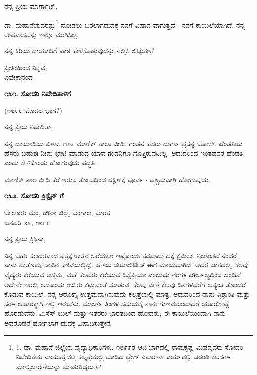 ನನ್ನ ಪ್ರಿಯ ಮಾರ್ಗಾಟ್,

ಡಾ. ಮಹಾನೆಯವರನ್ನು\footnote{1. ಡಾ. ಮಹಾನೆ ಜಿಲ್ಲೆಯ ವೈದ್ಯಾಧಿಕಾರಿಗಳು. ೧೮೯೯ರ ಆದಿ ಭಾಗದಲ್ಲಿ ರಾಮಕೃಷ್ಣ ಮಿಷನ್ನವರು ಸೋದರಿ ನಿವೇದಿತೆಯ ನಾಯಕತ್ವದಲ್ಲಿ ಕಲ್ಕತ್ತೆಯಲ್ಲಿ ಮಾಡಿದ ಪ್ಲೇಗ್ ನಿವಾರಣಾ ಕಾರ್ಯದಲ್ಲಿ ಚರಂಡಿ ಕೆಲಸಗಳ ಮೇಲ್ವಿಚಾರಣೆಯನ್ನು ಮಾಡುತ್ತಿದ್ದರು.} ನೋಡಲು ಬರಲಾಗದುದಕ್ಕೆ ನನಗೆ ವಿಷಾದ ವಾಗುತ್ತದೆ - ನನಗೆ ಕಾಯಿಲೆಯಾಗಿದೆ. ನನ್ನ ಉಪವಾಸವನ್ನು ಇನ್ನೂ ಮುಗಿಸಿಲ್ಲ.

ನನ್ನ ಕಿರಿಯ ದಾಯಾದಿಗೆ ಪಾಠ ಹೇಳಿಕೊಡುವುದನ್ನು ನಿಲ್ಲಿಸಿ ಬಿಟ್ಟೆಯಾ?

\begin{flushright}
ಪ್ರೀತಿಯಿಂದ ನಿನ್ನವ,\\ವಿವೇಕಾನಂದ
\end{flushright}

\begin{center}
\textbf{೧೩೧. ಸೋದರಿ ನಿವೇದಿತಾಳಿಗೆ}
\end{center}

\begin{flushright}
(೧೮೯೯ ಮೊದಲ ಭಾಗ?)
\end{flushright}

ನನ್ನ ಪ್ರಿಯ ನಿವೇದಿತಾ,

ನನ್ನ ದಾಯಾದಿಯ ವಿಳಾಸ ೧೨೭ ಮಾಣಿಕ್ ತಾಲಾ ಬೀದಿ. ಗಂಡನ ಹೆಸರು ದುರ್ಗಾ ಪ್ರಸನ್ನ ಬೋಸ್. ಹೆಂಡತಿಯ ಹೆಸರು ಬಹುಶಃ ನೀನು ಭೇಟಿ ಮಾಡುವ ಯಾವ ಗಂಡನಿಗೂ ಗೊತ್ತಿರುವುದಿಲ್ಲ. ಆದುದರಿಂದ ಇಂತಹವರ ಹೆಂಡತಿ ಎಂದು ಕೇಳಿಕೊಂಡು ಹೋಗುವುದು ಪದ್ಧತಿ.

ಮಾಣಿಕ್ ತಾಲ ಬೀದಿ ಕೆರೆ ಇರುವ ತೋಟದಿಂದ ದಕ್ಷಿಣಕ್ಕೆ ಪೂರ್ವ - ಪಶ್ಚಿಮವಾಗಿ ಹೋಗುವುದು.

\begin{center}
\textbf{೧೩೨. ಸೋದರಿ ಕ್ರಿಸ್ಟೈನ್ ಗೆ}
\end{center}

\begin{flushright}
ಬೇಲೂರು ಮಠ, ಹೌರಾ ಜಿಲ್ಲೆ, ಬಂಗಾಲ, ಭಾರತ\\ಜನವರಿ ೨೬, ೧೮೯೯
\end{flushright}

ನನ್ನ ಪ್ರಿಯ ಕ್ರಿಸ್ಟಿನಾ,

ನಿನ್ನ ಬಹು ಸುಂದರವಾದ ಪತ್ರಕ್ಕೆ ಉತ್ತರ ಬರೆಯಲು ಇಷ್ಟೊಂದು ತಡವಾದು ದಕ್ಕೆ ಕ್ಷಮಿಸು. ನಿಜಾಂಶವೇನೆಂದರೆ, ನಾನು ಮತ್ತೊಮ್ಮೆ ಸಾವಿನ ಕಣಿವೆಯಲ್ಲಿದ್ದೆ. ಹಳೆಯ ಡಯಾಬಿಟೀಸ್ ಈಗ ಮಾಯವಾಗಿದೆ. ಅದರ ಜಾಗದಲ್ಲಿ, ಕೆಲವು ವೈದ್ಯರು ಕರೆಯುವ ಅಸ್ತಮ, ಮತ್ತೆ ಕೆಲವರು ಕರೆಯುವ ಡಿಸ್ಪೆಪ್ಸಿಯಾ ಎಂಬುದು ನರಗಳ ದೌರ್ಬಲ್ಯದಿಂದ ಬಂದಿವೆ. ಅದೇನೇ ಇರಲಿ, ಅದೊಂದು ಉಸಿರು ಕಟ್ಟುವಂತೆ ಮಾಡುವ, ಕೆಲವು ವೇಳೆ ಕೆಲವು ದಿನಗಳವರೆಗೆ ಅತ್ಯಂತ ತೊಂದರೆ ಕೊಡುವ ಕಾಯಿಲೆ. ನನ್ನ ಆರೋಗ್ಯ ಉತ್ತಮವಾಗಿರುವುದು ಕಲ್ಕತ್ತೆಯಲ್ಲಿ ಮಾತ್ರ; ಆದುದರಿಂದ ನಾನು ವಿಶ್ರಾಂತಿ ಮತ್ತು ಸರಳ ಆಹಾರಕ್ಕಾಗಿ ಇಲ್ಲಿ ಇರುವೆನು. ಮಾರ್ಚ್ ತಿಂಗಳ ಸಮಯಕ್ಕೆ ನಾನು ಗುಣಮುಖವಾದರೆ ಯೂರೋಪ್ಗೆ ಹೊರಡುವೆನು. ಮಿಸೆಸ್ ಬುಲ್ ಮತ್ತು ಇತರರು ಭಾರತದಿಂದ ಹೋದರು; ಈ ಕಾಯಿಲೆಯಿಂದಾಗಿ ನಾನು ಅವರೊಡನೆ ಹೋಗಲಾಗ ದುದಕ್ಕೆ ವಿಷಾದಿಸುತ್ತೇನೆ.

